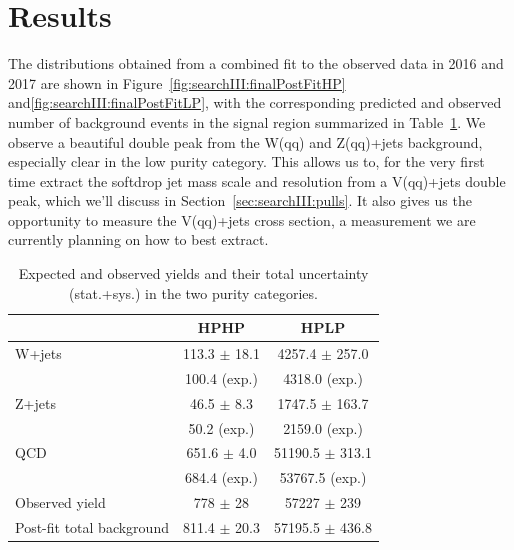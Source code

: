 \section{Results}
The distributions obtained from a combined fit to the observed data in 2016 and 2017 are shown in Figure~\ref{fig:searchIII:finalPostFitHP} and\ref{fig:searchIII:finalPostFitLP}, with the corresponding predicted and observed number of background events in the signal region summarized in Table~\ref{tab:searchIII:ObsEvents}. We observe a beautiful double peak from the W(qq) and Z(qq)+jets background, especially clear in the low purity category. This allows us to, for the very first time extract the softdrop jet mass scale and resolution from a V(qq)+jets double peak, which we'll discuss in Section~\ref{sec:searchIII:pulls}. It also gives us the opportunity to measure the V(qq)+jets cross section, a measurement we are currently planning on how to best extract.
\begin{table}[h!]
\centering
\begin{tabular}{lcc} 
 & HPHP & HPLP\\
 \hline
 \hline
W+jets & 113.3 $\pm$ 18.1 & 4257.4 $\pm$ 257.0 \\
            & 100.4 (exp.) & 4318.0 (exp.)\\
Z+jets & 46.5 $\pm$ 8.3 & 1747.5 $\pm$ 163.7\\
           & 50.2 (exp.) & 2159.0 (exp.) \\
QCD  & 651.6 $\pm$ 4.0 & 51190.5 $\pm$ 313.1 \\
          & 684.4 (exp.) & 53767.5 (exp.) \\
\hline
Observed yield & 778 $\pm$ 28 & 57227 $\pm$ 239\\
Post-fit total background & 811.4 $\pm$ 20.3 & 57195.5 $\pm$ 436.8\\
\hline
\hline
\end{tabular} 
\caption{Expected and observed yields and their total uncertainty (stat.+sys.) in the two purity categories.} 
\label{tab:searchIII:ObsEvents}
\end{table}

